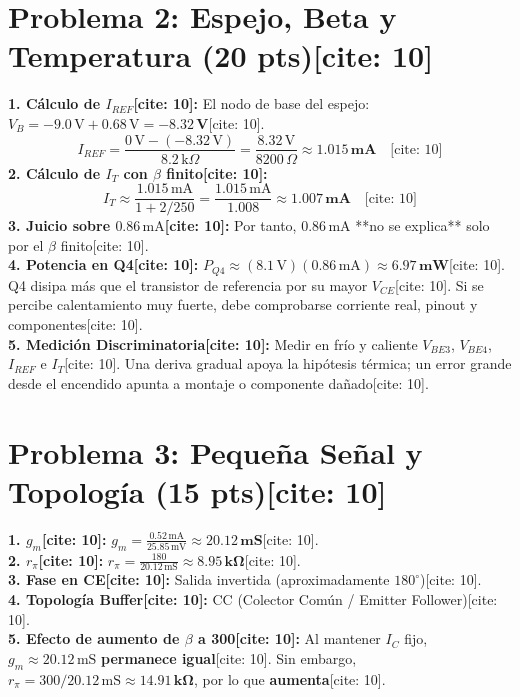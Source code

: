 \documentclass[11pt, a4paper]{article}
\begin{document}
\section*{Problema 2: Espejo, Beta y Temperatura (20 pts)[cite: 10]}
\textbf{1. Cálculo de $I_{REF}$[cite: 10]:}
El nodo de base del espejo: $V_B = -9.0\,\text{V} + 0.68\,\text{V} = \mathbf{-8.32\,\text{V}}$[cite: 10].
\begin{equation*}
    I_{REF} = \frac{0\,\text{V} - (-8.32\,\text{V})}{8.2\,\text{k}\Omega} = \frac{8.32\,\text{V}}{8200\,\Omega} \approx \mathbf{1.015\,\text{mA}} \quad \text{[cite: 10]}
\end{equation*}
\textbf{2. Cálculo de $I_T$ con $\beta$ finito[cite: 10]:}
\begin{equation*}
    I_T \approx \frac{1.015\,\text{mA}}{1 + 2/250} = \frac{1.015\,\text{mA}}{1.008} \approx \mathbf{1.007\,\text{mA}} \quad \text{[cite: 10]}
\end{equation*}
\textbf{3. Juicio sobre $0.86\,\text{mA}$[cite: 10]:} Por tanto, $0.86\,\text{mA}$ **no se explica** solo por el $\beta$ finito[cite: 10]. \\
\textbf{4. Potencia en Q4[cite: 10]:} $P_{Q4} \approx (8.1\,\text{V})(0.86\,\text{mA}) \approx \mathbf{6.97\,\text{mW}}$[cite: 10]. Q4 disipa más que el transistor de referencia por su mayor $V_{CE}$[cite: 10]. Si se percibe calentamiento muy fuerte, debe comprobarse corriente real, pinout y componentes[cite: 10]. \\
\textbf{5. Medición Discriminatoria[cite: 10]:} Medir en frío y caliente $V_{BE3}$, $V_{BE4}$, $I_{REF}$ e $I_T$[cite: 10]. Una deriva gradual apoya la hipótesis térmica; un error grande desde el encendido apunta a montaje o componente dañado[cite: 10].

\section*{Problema 3: Pequeña Señal y Topología (15 pts)[cite: 10]}
\textbf{1. $g_m$[cite: 10]:} $\displaystyle g_m = \frac{0.52\,\text{mA}}{25.85\,\text{mV}} \approx \mathbf{20.12\,\text{mS}}$[cite: 10]. \\
\textbf{2. $r_\pi$[cite: 10]:} $\displaystyle r_\pi = \frac{180}{20.12\,\text{mS}} \approx \mathbf{8.95\,\text{k}\Omega}$[cite: 10]. \\
\textbf{3. Fase en CE[cite: 10]:} Salida invertida (aproximadamente $180^\circ$)[cite: 10]. \\
\textbf{4. Topología Buffer[cite: 10]:} CC (Colector Común / Emitter Follower)[cite: 10]. \\
\textbf{5. Efecto de aumento de $\beta$ a 300[cite: 10]:} Al mantener $I_C$ fijo, $g_m \approx 20.12\,\text{mS}$ \textbf{permanece igual}[cite: 10]. Sin embargo, $r_\pi = 300 / 20.12\,\text{mS} \approx \mathbf{14.91\,\text{k}\Omega}$, por lo que \textbf{aumenta}[cite: 10].
\end{document}
